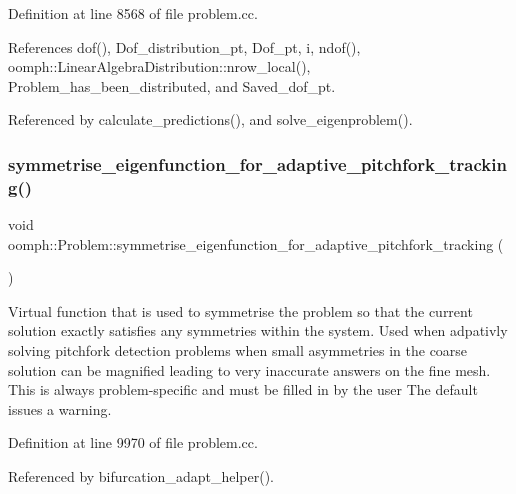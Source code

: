 Definition at line 8568 of file problem.\+cc.



References dof(), Dof\+\_\+distribution\+\_\+pt, Dof\+\_\+pt, i, ndof(), oomph\+::\+Linear\+Algebra\+Distribution\+::nrow\+\_\+local(), Problem\+\_\+has\+\_\+been\+\_\+distributed, and Saved\+\_\+dof\+\_\+pt.



Referenced by calculate\+\_\+predictions(), and solve\+\_\+eigenproblem().

\mbox{\label{classoomph_1_1Problem_abbcf4965b6052758e49cf511947fd3f0}} 
\subsubsection{\texorpdfstring{symmetrise\+\_\+eigenfunction\+\_\+for\+\_\+adaptive\+\_\+pitchfork\+\_\+tracking()}{symmetrise\_eigenfunction\_for\_adaptive\_pitchfork\_tracking()}}
{\footnotesize\ttfamily void oomph\+::\+Problem\+::symmetrise\+\_\+eigenfunction\+\_\+for\+\_\+adaptive\+\_\+pitchfork\+\_\+tracking (\begin{DoxyParamCaption}{ }\end{DoxyParamCaption})\hspace{0.3cm}{\ttfamily [virtual]}}



Virtual function that is used to symmetrise the problem so that the current solution exactly satisfies any symmetries within the system. Used when adpativly solving pitchfork detection problems when small asymmetries in the coarse solution can be magnified leading to very inaccurate answers on the fine mesh. This is always problem-\/specific and must be filled in by the user The default issues a warning. 



Definition at line 9970 of file problem.\+cc.



Referenced by bifurcation\+\_\+adapt\+\_\+helper().

\mbox{\label{classoomph_1_1Problem_a5d9a3ba5696a7bcd275223ff16b7392e}} 
